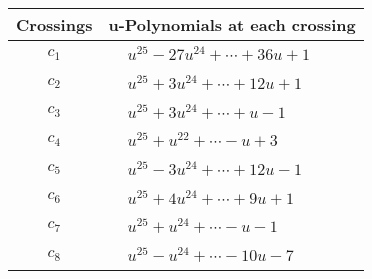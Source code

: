 \documentclass[1p]{elsarticle_modified}
\theoremstyle{definition}
\begin{document}
\begin{tabular}{m{50pt}|m{274pt}}
Crossings & \hspace{64pt}u-Polynomials at each crossing \\
\hline $$\begin{aligned}c_{1}\end{aligned}$$&$\begin{aligned}
&u^{25}-27 u^{24}+\cdots+36 u+1
\end{aligned}$\\
\hline $$\begin{aligned}c_{2}\end{aligned}$$&$\begin{aligned}
&u^{25}+3 u^{24}+\cdots+12 u+1
\end{aligned}$\\
\hline $$\begin{aligned}c_{3}\end{aligned}$$&$\begin{aligned}
&u^{25}+3 u^{24}+\cdots+u-1
\end{aligned}$\\
\hline $$\begin{aligned}c_{4}\end{aligned}$$&$\begin{aligned}
&u^{25}+u^{22}+\cdots- u+3
\end{aligned}$\\
\hline $$\begin{aligned}c_{5}\end{aligned}$$&$\begin{aligned}
&u^{25}-3 u^{24}+\cdots+12 u-1
\end{aligned}$\\
\hline $$\begin{aligned}c_{6}\end{aligned}$$&$\begin{aligned}
&u^{25}+4 u^{24}+\cdots+9 u+1
\end{aligned}$\\
\hline $$\begin{aligned}c_{7}\end{aligned}$$&$\begin{aligned}
&u^{25}+u^{24}+\cdots- u-1
\end{aligned}$\\
\hline $$\begin{aligned}c_{8}\end{aligned}$$&$\begin{aligned}
&u^{25}- u^{24}+\cdots-10 u-7
\end{aligned}$\\

\end{tabular}
\end{document}
